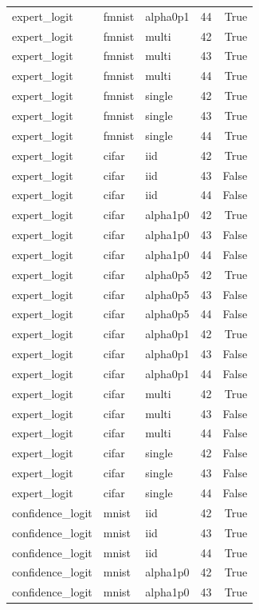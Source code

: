 \begin{tabular}{lllrr}
expert\_logit & fmnist & alpha0p1 & 44 & True \\
expert\_logit & fmnist & multi & 42 & True \\
expert\_logit & fmnist & multi & 43 & True \\
expert\_logit & fmnist & multi & 44 & True \\
expert\_logit & fmnist & single & 42 & True \\
expert\_logit & fmnist & single & 43 & True \\
expert\_logit & fmnist & single & 44 & True \\
expert\_logit & cifar & iid & 42 & True \\
expert\_logit & cifar & iid & 43 & False \\
expert\_logit & cifar & iid & 44 & False \\
expert\_logit & cifar & alpha1p0 & 42 & True \\
expert\_logit & cifar & alpha1p0 & 43 & False \\
expert\_logit & cifar & alpha1p0 & 44 & False \\
expert\_logit & cifar & alpha0p5 & 42 & True \\
expert\_logit & cifar & alpha0p5 & 43 & False \\
expert\_logit & cifar & alpha0p5 & 44 & False \\
expert\_logit & cifar & alpha0p1 & 42 & True \\
expert\_logit & cifar & alpha0p1 & 43 & False \\
expert\_logit & cifar & alpha0p1 & 44 & False \\
expert\_logit & cifar & multi & 42 & True \\
expert\_logit & cifar & multi & 43 & False \\
expert\_logit & cifar & multi & 44 & False \\
expert\_logit & cifar & single & 42 & False \\
expert\_logit & cifar & single & 43 & False \\
expert\_logit & cifar & single & 44 & False \\
confidence\_logit & mnist & iid & 42 & True \\
confidence\_logit & mnist & iid & 43 & True \\
confidence\_logit & mnist & iid & 44 & True \\
confidence\_logit & mnist & alpha1p0 & 42 & True \\
confidence\_logit & mnist & alpha1p0 & 43 & True \\

\end{tabular}
